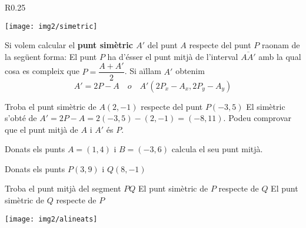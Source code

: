 \documentclass[11pt, a4paper, pdf]{article}
\begin{document}
\begin{theorybox}
	\begin{wrapfigure}{R}{0.25\textwidth} 
		\vspace{-0.5cm}
		\begin{center}
			\texttt{[image: img2/simetric]}
		\end{center}
	\end{wrapfigure}
	Si volem calcular el \textbf{punt simètric $A'$} del punt $A$ respecte del punt $P$ raonam de la següent forma:
	El punt $P$ ha d'ésser el punt mitjà de l'interval $\overline{AA'}$ amb la qual cosa es compleix que  $P = \dfrac{A+A'}{2}$. Si aïllam $A'$ obtenim 
	\begin{equation*}
	A' = 2P-A \,\,\,\,\,\, o \,\,\,\,\,\,A' \left( 2P_x-A_x,  2P_y-A_y \right)
	\end{equation*}
	
\end{theorybox}

\vspace{-0.5cm}


\begin{resolt}{Troba el punt simètric de $A(2,-1)$ respecte del punt $P(-3,5)$}
	El simètric s'obté de $A' = 2P-A=2(-3,5)-(2,-1)=(-8, 11)$. Podeu comprovar que el punt mitjà de $A$ i $A'$ és $P$.
\end{resolt}



\begin{mylist}
	\item  Donats els punts $A=\left(1,4\right)$ i $B=\left(-3,6\right)$ calcula el seu punt mitjà.
	
	\item 
	\begin{minipage}{0.7\textwidth}
			Donats els punts $P(3,9)$ i $Q(8,-1)$
		\begin{tasks}
			\task Troba el punt mitjà del segment $PQ$
			\task El punt simètric de $P$ respecte de $Q$
			\task El punt simètric de $Q$ respecte de $P$
		\end{tasks}
	\end{minipage}	
	\begin{minipage}{0.3\textwidth}
		\vspace{-1cm}
	\begin{center}
		\texttt{[image: img2/alineats]}
	\end{center}
	
	\end{minipage}

 
	
\end{mylist}
\end{document}
